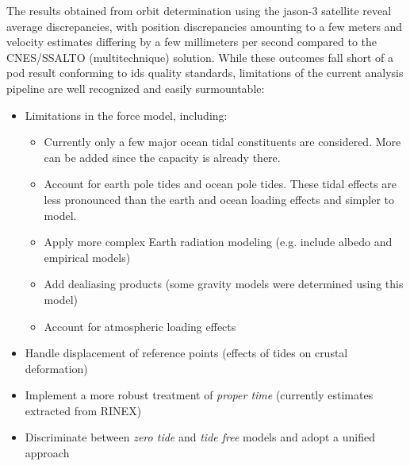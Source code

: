\iffalse
Results obtained for the case of orbit determination using the \gls{jason}-3 satellite, 
show average discrepancies, with respect to the \gls{cnes}/SSALTO (multitechnique) solution, 
that amount to a few \si{\meter} in position and a few \si{\milli\meter\per\sec} for 
velocity estimates. Evidently, this cannot be qualified as a \gls{pod} result, but limitations 
of the current analysis pipeline are well identified and easy to transcend. These are
\fi
The results obtained from orbit determination using the \gls{jason}-3 satellite 
reveal average discrepancies, with position discrepancies amounting to a few 
meters and velocity estimates differing by a few millimeters per second compared 
to the CNES/SSALTO (multitechnique) solution. While these outcomes fall short of 
a \gls{pod} result conforming to \gls{ids} quality standards, limitations of the 
current analysis pipeline are well recognized and easily surmountable:
\begin{itemize}
  \item Limitations in the force model, including:
    \begin{itemize}
      \item Currently only a few major ocean tidal constituents are considered. More 
        can be added since the capacity is already there.
      \item Account for earth pole tides and ocean pole tides. These 
        tidal effects are less pronounced than the earth and ocean loading effects and 
        simpler to model.
      \item Apply more complex Earth radiation modeling (e.g. include albedo and empirical models)
      \item Add dealiasing products (some gravity models were determined using this model)
      \item Account for atmospheric loading effects
    \end{itemize}
  \item Handle displacement of reference points (effects of tides on crustal deformation)
  \item Implement a more robust treatment of \emph{proper time} (currently estimates extracted from RINEX)
  \item Discriminate between \emph{zero tide} and \emph{tide free} models and adopt a unified approach
\end{itemize}

